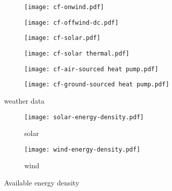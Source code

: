 \begin{figure}
    \centering
    \begin{subfigure}[t]{0.49\textwidth}
        \centering
        \texttt{[image: cf-onwind.pdf]}
    \end{subfigure}
    \begin{subfigure}[t]{0.49\textwidth}
        \centering
        \texttt{[image: cf-offwind-dc.pdf]}
    \end{subfigure}
    \begin{subfigure}[t]{0.49\textwidth}
        \centering
        \texttt{[image: cf-solar.pdf]}
    \end{subfigure}
    \begin{subfigure}[t]{0.49\textwidth}
        \centering
        \texttt{[image: cf-solar thermal.pdf]}
    \end{subfigure}
    \begin{subfigure}[t]{0.49\textwidth}
        \centering
        \texttt{[image: cf-air-sourced heat pump.pdf]}
    \end{subfigure}
    \begin{subfigure}[t]{0.49\textwidth}
        \centering
        \texttt{[image: cf-ground-sourced heat pump.pdf]}
    \end{subfigure}
    \caption{weather data}
    \label{fig:weather-data}
\end{figure}

\begin{figure}
    \centering
    \begin{subfigure}[t]{0.49\textwidth}
        \centering
        \caption{solar}
        \texttt{[image: solar-energy-density.pdf]}
    \end{subfigure}
    \begin{subfigure}[t]{0.49\textwidth}
        \centering
        \caption{wind}
        \texttt{[image: wind-energy-density.pdf]}
    \end{subfigure}
    \caption{Available energy density}
    \label{fig:energy-density}
\end{figure}

